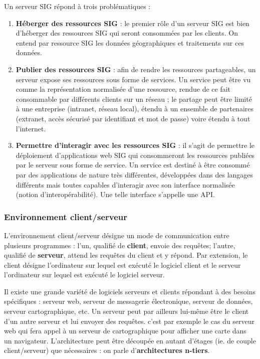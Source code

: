 \documentclass[11pt]{article}
\begin{document}
Un serveur SIG répond à trois problématiques :
\begin{enumerate}
	\item \textbf{Héberger des ressources SIG} : le premier rôle d'un serveur SIG est bien d'héberger des ressources SIG qui seront consommées par les clients. On entend par ressource SIG les données géographiques et traitements sur ces données.
	\item \textbf{Publier des ressources SIG} : afin de rendre les ressources partageables, un serveur expose ses ressources sous forme de services. Un service peut être vu comme la représentation normalisée d’une ressource, rendue de ce fait consommable par différents clients sur un réseau ; le partage peut être limité à une entreprise (intranet, réseau local), étendu à un ensemble de partenaires (extranet, accès sécurisé par identifiant et mot de passe) voire étendu à tout l’internet.
	\item \textbf{Permettre d’interagir avec les ressources SIG} : il s'agit de permettre le déploiement d'applications web SIG qui consommeront les ressources publiées par le serveur sous forme de service. 
	Un service est destiné à être consommé par des applications de nature très différentes, développées dans des langages différents mais toutes capables d’interagir avec son interface normalisée (notion d'interopérabilité). Une telle interface s’appelle une API.
\end{enumerate}


\subsubsection{Environnement client/serveur}
L'environnement client/serveur désigne un mode de communication entre plusieurs programmes : l'un, qualifié de \textbf{client}, envoie des requêtes; l'autre, qualifié de \textbf{serveur}, attend les requêtes du client et y répond. Par extension, le client désigne l'ordinateur sur lequel est exécuté le logiciel client et le serveur l'ordinateur sur lequel est exécuté le logiciel serveur.

Il existe une grande variété de logiciels serveurs et clients répondant à des besoins spécifiques : serveur web, serveur de messagerie électronique, serveur de données, serveur cartographique, etc. Un serveur peut par ailleurs lui-même être le client d'un autre serveur et lui envoyer des requêtes. c'est par exemple le cas du serveur web qui fera appel à un serveur de cartographique pour afficher une carte dans un navigateur. L'architecture peut être découpée en autant d'étages (ie. de couple client/serveur) que nécessaires : on parle d'\textbf{architectures n-tiers}.
\end{document}
